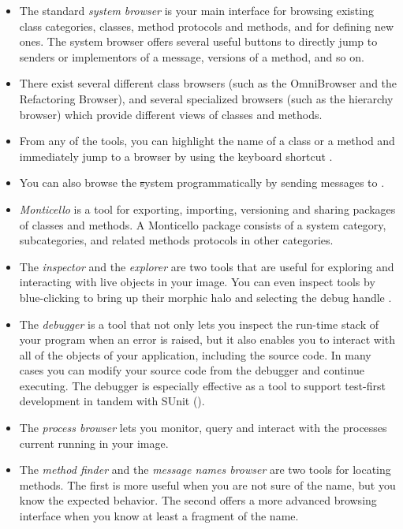 \documentclass[a4paper,10pt,twoside]{book}
\begin{document}
\begin{itemize}
  \item The standard \emph{system browser} is your main interface for browsing existing class categories, classes, method protocols and methods, and for defining new ones.
  The system browser offers several useful buttons to directly jump to senders or implementors of a message, versions of a method, and so on.
  \item There exist several different class browsers (such as the OmniBrowser and the Refactoring Browser), and several specialized browsers (such as the hierarchy browser) which provide different views of classes and methods.
  \item From any of the tools, you can highlight the name of a class or a method and immediately jump to a browser by using the keyboard shortcut .
  \item You can also browse the \st system programmatically by sending messages to .
  \item \emph{Monticello} is a tool for exporting, importing, versioning and sharing packages of classes and methods.
  A Monticello package consists of a system category, subcategories, and related methods protocols in other categories.
  \item The \emph{inspector} and the \emph{explorer} are two tools that are useful for exploring and interacting with live objects in your image.
  You can even inspect tools by blue-clicking to bring up their morphic halo and selecting the debug handle \debugHandle.
  \item The \emph{debugger} is a tool that not only lets you inspect the run-time stack of your program when an error is raised, but it also enables you to interact with all of the objects of your application, including the source code. In many cases you can modify your source code from the debugger and continue executing. The debugger is especially effective as a tool to support test-first development in tandem with SUnit ().
  \item The \emph{process browser} lets you monitor, query and interact with the processes current running in your image.
  \item The \emph{method finder} and the \emph{message names browser} are two tools for locating methods. The first is more useful when you are not sure of the name, but you know the expected behavior. The second offers a more advanced browsing interface when you know at least a fragment of the name.

\end{itemize}
\end{document}
